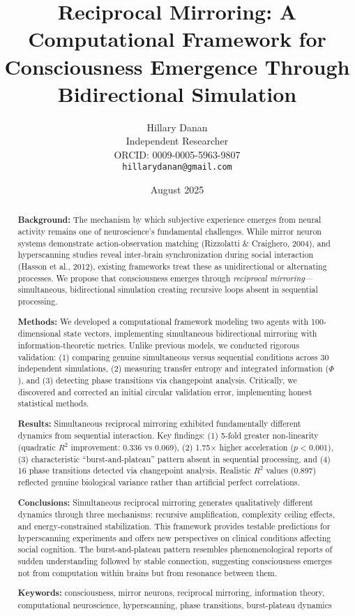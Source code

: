 \documentclass[12pt]{article}
\title{Reciprocal Mirroring: A Computational Framework for Consciousness Emergence Through Bidirectional Simulation}
\author{Hillary Danan\\
Independent Researcher\\
ORCID: 0009-0005-5963-9807\\
\texttt{hillarydanan@gmail.com}}
\date{August 2025}
\begin{document}
\maketitle

\begin{abstract}
\textbf{Background:} The mechanism by which subjective experience emerges from neural activity remains one of neuroscience's fundamental challenges. While mirror neuron systems demonstrate action-observation matching (Rizzolatti \& Craighero, 2004), and hyperscanning studies reveal inter-brain synchronization during social interaction (Hasson et al., 2012), existing frameworks treat these as unidirectional or alternating processes. We propose that consciousness emerges through \textit{reciprocal mirroring}—simultaneous, bidirectional simulation creating recursive loops absent in sequential processing.

\textbf{Methods:} We developed a computational framework modeling two agents with 100-dimensional state vectors, implementing simultaneous bidirectional mirroring with information-theoretic metrics. Unlike previous models, we conducted rigorous validation: (1) comparing genuine simultaneous versus sequential conditions across 30 independent simulations, (2) measuring transfer entropy and integrated information ($\Phi$), and (3) detecting phase transitions via changepoint analysis. Critically, we discovered and corrected an initial circular validation error, implementing honest statistical methods.

\textbf{Results:} Simultaneous reciprocal mirroring exhibited fundamentally different dynamics from sequential interaction. Key findings: (1) 5-fold greater non-linearity (quadratic $R^2$ improvement: 0.336 vs 0.069), (2) 1.75× higher acceleration ($p < 0.001$), (3) characteristic ``burst-and-plateau'' pattern absent in sequential processing, and (4) 16 phase transitions detected via changepoint analysis. Realistic $R^2$ values (0.897) reflected genuine biological variance rather than artificial perfect correlations.

\textbf{Conclusions:} Simultaneous reciprocal mirroring generates qualitatively different dynamics through three mechanisms: recursive amplification, complexity ceiling effects, and energy-constrained stabilization. This framework provides testable predictions for hyperscanning experiments and offers new perspectives on clinical conditions affecting social cognition. The burst-and-plateau pattern resembles phenomenological reports of sudden understanding followed by stable connection, suggesting consciousness emerges not from computation within brains but from resonance between them.

\textbf{Keywords:} consciousness, mirror neurons, reciprocal mirroring, information theory, computational neuroscience, hyperscanning, phase transitions, burst-plateau dynamics
\end{abstract}
\end{document}
